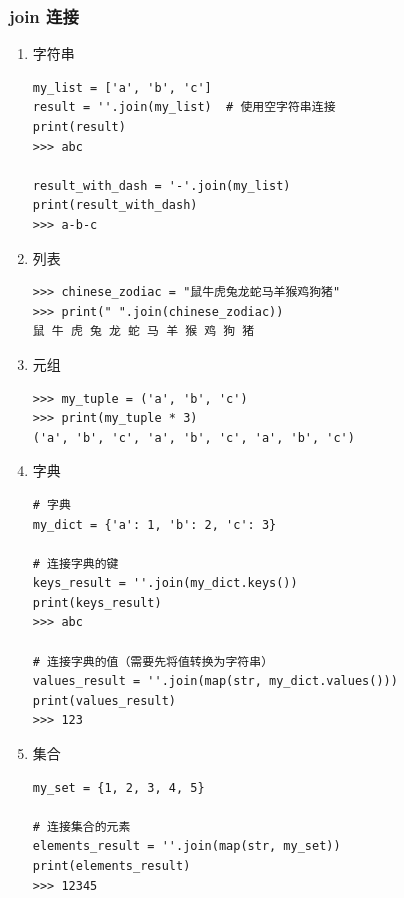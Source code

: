 \subsubsection{join 连接}
\begin{enumerate}[label=\arabic*)]
    \item 字符串
\begin{lstlisting}[style=demostyle,numbers=none]
my_list = ['a', 'b', 'c']
result = ''.join(my_list)  # 使用空字符串连接
print(result)
>>> abc

result_with_dash = '-'.join(my_list)
print(result_with_dash) 
>>> a-b-c
\end{lstlisting}

    \item 列表
\begin{lstlisting}[style=demostyle,numbers=none]
>>> chinese_zodiac = "鼠牛虎兔龙蛇马羊猴鸡狗猪"
>>> print(" ".join(chinese_zodiac))
鼠 牛 虎 兔 龙 蛇 马 羊 猴 鸡 狗 猪
\end{lstlisting}

    \item 元组
\begin{lstlisting}[style=demostyle,numbers=none]
>>> my_tuple = ('a', 'b', 'c')
>>> print(my_tuple * 3)
('a', 'b', 'c', 'a', 'b', 'c', 'a', 'b', 'c')
\end{lstlisting}

    \item 字典
\begin{lstlisting}[style=demostyle,numbers=none]
# 字典
my_dict = {'a': 1, 'b': 2, 'c': 3}
 
# 连接字典的键
keys_result = ''.join(my_dict.keys())
print(keys_result)  
>>> abc
 
# 连接字典的值（需要先将值转换为字符串）
values_result = ''.join(map(str, my_dict.values()))
print(values_result)  
>>> 123
\end{lstlisting}

    \item 集合

\begin{lstlisting}[style=demostyle,numbers=none]
my_set = {1, 2, 3, 4, 5}
 
# 连接集合的元素
elements_result = ''.join(map(str, my_set))
print(elements_result)  
>>> 12345
\end{lstlisting}
\end{enumerate}




